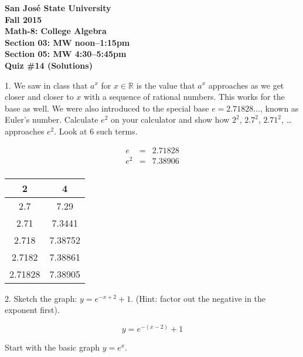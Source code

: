 \documentclass[letterpaper, 12pt]{article}
\begin{document}
\begin{center}
\bfseries
San Jos\'{e} State University \\
Fall 2015 \\
Math-8: College Algebra \\
Section 03: MW noon--1:15pm \\
Section 05: MW 4:30--5:45pm \\
\bigskip
Quiz \#14 (Solutions)
\end{center}

\bigskip

1. We saw in class that $a^x$ for $x\in\mathbb{R}$ is the value that $a^x$
approaches as we get closer and closer to $x$ with a sequence of rational
numbers. This works for the base as well. We were also introduced to the
special base $e=2.71828\ldots$, known as Euler's number. Calculate $e^2$ on
your calculator and show how $2^2$, $2.7^2$, $2.71^2$, \ldots approaches
$e^2$. Look at 6 such terms.

\bigskip

\begin{eqnarray*}
e &=& 2.71828 \\
e^2 &=& 7.38906 \\
\end{eqnarray*}

\begin{tabular}{|c|c|}
\hline
2 & 4 \\
\hline
2.7 & 7.29 \\
\hline
2.71 & 7.3441 \\
\hline
2.718 & 7.38752 \\
\hline
2.7182 & 7.38861 \\
\hline
2.71828 & 7.38905 \\
\hline
\end{tabular}

\bigskip

2. Sketch the graph: $y=e^{-x+2}+1$. (Hint: factor out the negative in the
exponent first).

\[y=e^{-(x-2)}+1\]

\bigskip

Start with the basic graph $y=e^x$.

\bigskip

\begin{center}
\end{center}
\end{document}
